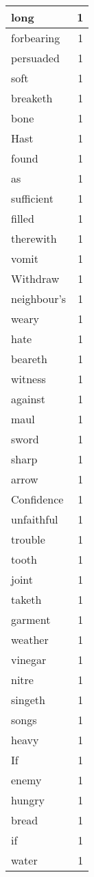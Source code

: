 \begin{center}
\begin{longtable}{l|r}
long & 1\\ \hline 
forbearing & 1\\ \hline 
persuaded & 1\\ \hline 
soft & 1\\ \hline 
breaketh & 1\\ \hline 
bone & 1\\ \hline 
Hast & 1\\ \hline 
found & 1\\ \hline 
as & 1\\ \hline 
sufficient & 1\\ \hline 
filled & 1\\ \hline 
therewith & 1\\ \hline 
vomit & 1\\ \hline 
Withdraw & 1\\ \hline 
neighbour's & 1\\ \hline 
weary & 1\\ \hline 
hate & 1\\ \hline 
beareth & 1\\ \hline 
witness & 1\\ \hline 
against & 1\\ \hline 
maul & 1\\ \hline 
sword & 1\\ \hline 
sharp & 1\\ \hline 
arrow & 1\\ \hline 
Confidence & 1\\ \hline 
unfaithful & 1\\ \hline 
trouble & 1\\ \hline 
tooth & 1\\ \hline 
joint & 1\\ \hline 
taketh & 1\\ \hline 
garment & 1\\ \hline 
weather & 1\\ \hline 
vinegar & 1\\ \hline 
nitre & 1\\ \hline 
singeth & 1\\ \hline 
songs & 1\\ \hline 
heavy & 1\\ \hline 
If & 1\\ \hline 
enemy & 1\\ \hline 
hungry & 1\\ \hline 
bread & 1\\ \hline 
if & 1\\ \hline 
water & 1\\ \hline 

\end{longtable}
\end{center}
